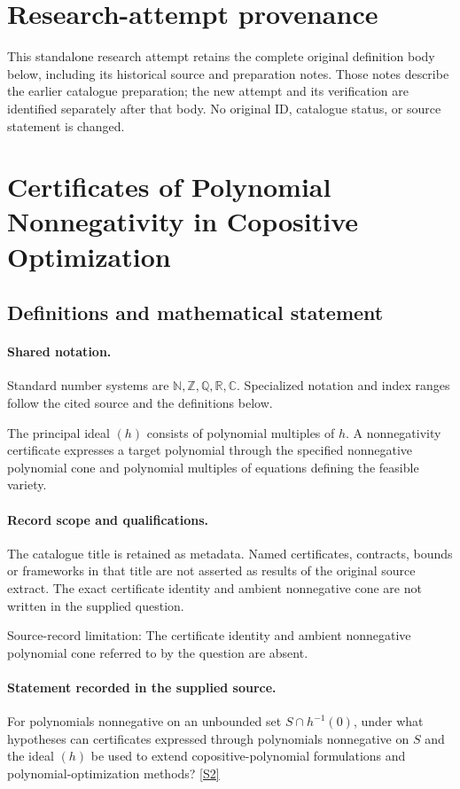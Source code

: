 \documentclass[11pt]{article}
\begin{document}
\section*{Research-attempt provenance}
This standalone research attempt retains the complete original definition body below,
including its historical source and preparation notes. Those notes describe the
earlier catalogue preparation; the new attempt and its verification are identified
separately after that body. No original ID, catalogue status, or source statement is changed.

\section{Certificates of Polynomial Nonnegativity in Copositive Optimization}\label{statement}

\subsection{Definitions and mathematical statement}

\paragraph{Shared notation.}Standard number systems are $\mathbb N,\mathbb Z,\mathbb Q,\mathbb R,\mathbb C$. Specialized notation and index ranges follow the cited source and the definitions below.


The principal ideal $(h)$ consists of polynomial multiples of $h$. A nonnegativity certificate expresses a target polynomial through the specified nonnegative polynomial cone and polynomial multiples of equations defining the feasible variety.
\paragraph{Record scope and qualifications.}
The catalogue title is retained as metadata. Named certificates, contracts, bounds or frameworks in that title are not asserted as results of the original source extract.
The exact certificate identity and ambient nonnegative cone are not written in the supplied question.

Source-record limitation: The certificate identity and ambient nonnegative polynomial cone referred to by the question are absent.
\paragraph{Statement recorded in the supplied source.}
For polynomials nonnegative on an unbounded set $S\cap h^{-1}(0)$, under what hypotheses can certificates expressed through polynomials nonnegative on $S$ and the ideal $(h)$ be used to extend copositive-polynomial formulations and polynomial-optimization methods? \href{https://doi.org/10.4171/owr/2017/52}{[S2]}
\end{document}
